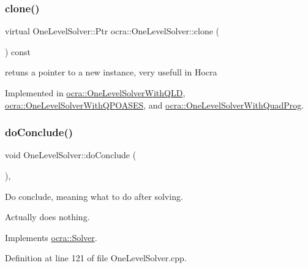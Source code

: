 \subsubsection{\texorpdfstring{clone()}{clone()}}
{\footnotesize\ttfamily virtual One\+Level\+Solver\+::\+Ptr ocra\+::\+One\+Level\+Solver\+::clone (\begin{DoxyParamCaption}{ }\end{DoxyParamCaption}) const\hspace{0.3cm}{\ttfamily [pure virtual]}}

retuns a pointer to a new instance, very usefull in Hocra 

Implemented in \hyperlink{classocra_1_1OneLevelSolverWithQLD_a8dc1522a50198d0120de3b29e94d66e8}{ocra\+::\+One\+Level\+Solver\+With\+Q\+LD}, \hyperlink{classocra_1_1OneLevelSolverWithQPOASES_ac92f5e6885ada1f68b2f3b31cacf43f5}{ocra\+::\+One\+Level\+Solver\+With\+Q\+P\+O\+A\+S\+ES}, and \hyperlink{classocra_1_1OneLevelSolverWithQuadProg_a706e7772885ae7ab3e78565d51286eac}{ocra\+::\+One\+Level\+Solver\+With\+Quad\+Prog}.

\hypertarget{classocra_1_1OneLevelSolver_a823e51eeddc6c8fd58a6aa2409ac3c07}{}\label{classocra_1_1OneLevelSolver_a823e51eeddc6c8fd58a6aa2409ac3c07} 
\subsubsection{\texorpdfstring{do\+Conclude()}{doConclude()}}
{\footnotesize\ttfamily void One\+Level\+Solver\+::do\+Conclude (\begin{DoxyParamCaption}{ }\end{DoxyParamCaption})\hspace{0.3cm}{\ttfamily [protected]}, {\ttfamily [virtual]}}

Do conclude, meaning what to do after solving.

Actually does nothing. 

Implements \hyperlink{classocra_1_1Solver_ac9d2d41d544b57a75e0d03db073d646e}{ocra\+::\+Solver}.



Definition at line 121 of file One\+Level\+Solver.\+cpp.

\hypertarget{classocra_1_1OneLevelSolver_a458cc8d801826b3b75c21212e39e7ca9}{}\label{classocra_1_1OneLevelSolver_a458cc8d801826b3b75c21212e39e7ca9} 
